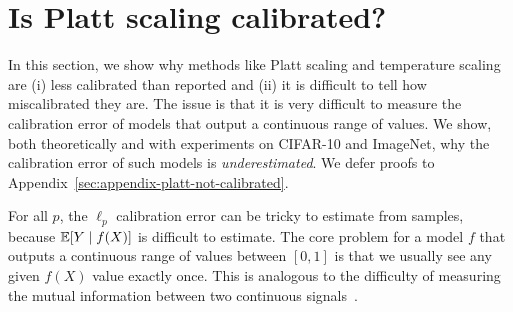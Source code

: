 \section{Is Platt scaling calibrated?}
\label{sec:challenges-measuring}

In this section, we show why methods like Platt scaling and temperature scaling are (i) less calibrated than reported and (ii) it is difficult to tell how miscalibrated they are. The issue is that it is very difficult  to measure the calibration error of models that output a continuous range of values. We show, both theoretically and with experiments on CIFAR-10 and ImageNet, why the calibration error of such models is \emph{underestimated}. We defer proofs to Appendix~\ref{sec:appendix-platt-not-calibrated}.





For all $p$, the $\ell_p$ calibration error can be tricky to estimate from samples, because $\mathbb{E}[Y \mid f(X)]$ is difficult to estimate. 
The core problem for a model $f$ that outputs a continuous range of values between $[0, 1]$ is that we usually see any given $f(X)$ value exactly once. This is analogous to the difficulty of measuring the mutual information between two continuous signals~\cite{paninski2003entropy}.

